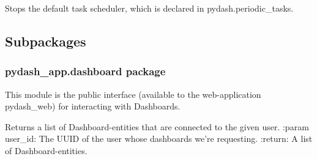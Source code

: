 \documentclass[letterpaper,10pt,english]{sphinxmanual}
\begin{document}

\begin{fulllineitems}
\label{\detokenize{pydash_app:pydash_app.stop_task_scheduler}}
Stops the default task scheduler, which is declared in pydash.periodic\_tasks.

\end{fulllineitems}



\subsection{Subpackages}
\label{\detokenize{pydash_app:subpackages}}

\subsubsection{pydash\_app.dashboard package}
\label{\detokenize{pydash_app.dashboard:module-pydash_app.dashboard}}\label{\detokenize{pydash_app.dashboard:pydash-app-dashboard-package}}\label{\detokenize{pydash_app.dashboard::doc}}
This module is the public interface (available to the web-application pydash\_web)
for interacting with Dashboards.

\begin{fulllineitems}
\label{\detokenize{pydash_app.dashboard:pydash_app.dashboard.add_to_repository}}
\end{fulllineitems}


\begin{fulllineitems}
\label{\detokenize{pydash_app.dashboard:pydash_app.dashboard.dashboards_of_user}}
Returns a list of Dashboard-entities that are connected to the given user.
:param user\_id: The UUID of the user whose dashboards we’re requesting.
:return: A list of Dashboard-entities.

\end{fulllineitems}
\end{document}
